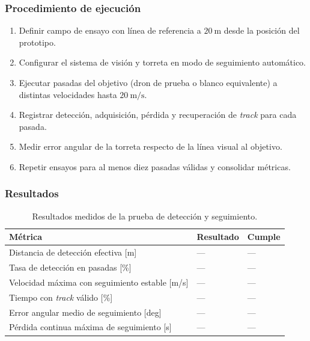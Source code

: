 \subsubsection{Procedimiento de ejecución}

\begin{enumerate}
    \item Definir campo de ensayo con línea de referencia a $20\ \text{m}$ desde la posición del prototipo.
    \item Configurar el sistema de visión y torreta en modo de seguimiento automático.
    \item Ejecutar pasadas del objetivo (dron de prueba o blanco equivalente) a distintas velocidades hasta $20\ \text{m/s}$.
    \item Registrar detección, adquisición, pérdida y recuperación de \textit{track} para cada pasada.
    \item Medir error angular de la torreta respecto de la línea visual al objetivo.
    \item Repetir ensayos para al menos diez pasadas válidas y consolidar métricas.
\end{enumerate}

\subsubsection{Resultados}

\begin{table}[H]
\centering
\small
\begin{tabular}{p{8.8cm} p{2.2cm} p{2.8cm}}
\toprule
\textbf{Métrica} & \textbf{Resultado} & \textbf{Cumple} \\
\midrule
Distancia de detección efectiva [m] & --- & --- \\
Tasa de detección en pasadas [\%] & --- & --- \\
Velocidad máxima con seguimiento estable [m/s] & --- & --- \\
Tiempo con \textit{track} válido [\%] & --- & --- \\
Error angular medio de seguimiento [deg] & --- & --- \\
Pérdida continua máxima de seguimiento [s] & --- & --- \\
\bottomrule
\end{tabular}
\caption{Resultados medidos de la prueba de detección y seguimiento.}
\label{tab:resultados_prueba_trackeo}
\end{table}

